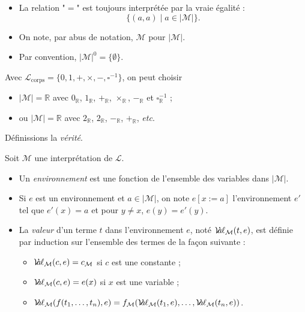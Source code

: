 \documentclass[./main]{subfiles}
\begin{document}
  \begin{rmk}
    \begin{itemize}
      \item La relation "$=$" est toujours interprétée par la vraie égalité :
        \[
        \{(a,a)  \mid a \in |\mathcal{M}|\} 
        .\]
      \item On note, par abus de notation, $\mathcal{M}$ pour $|\mathcal{M}|$.
      \item Par convention, $|\mathcal{M}|^0 = \{\emptyset\}$.
    \end{itemize}
  \end{rmk}

  \begin{exm}
      Avec $\mathcal{L}_\mathrm{corps} = \{0, 1, +, \times , -, \square^{-1}\} $, on peut choisir 
      \begin{itemize}
        \item $|\mathcal{M}| = \mathds{R}$ avec $0_\mathds{R}$, $1_\mathds{R}$, $+_\mathds{R}$, $\times_\mathds{R}$, $-_\mathds{R}$ et $\square^{-1}_\mathds{R}$ ;
        \item ou $|\mathcal{M}| = \mathds{R}$ avec $2_\mathds{R}$, $2_\mathds{R}$, $-_\mathds{R}$, $+_\mathds{R}$, \textit{etc}.
      \end{itemize}
  \end{exm}

  Définissions la \textit{vérité}.

  \begin{defn}
    Soit $\mathcal{M}$ une interprétation de $\mathcal{L}$.
    \begin{itemize}
      \item Un \textit{environnement} est une fonction de l'ensemble des variables dans $|\mathcal{M}|$.
      \item Si $e$ est un environnement et $a \in |\mathcal{M}|$, on note $e[x:=a]$ l'environnement $e'$ tel que $e'(x) = a$ et pour $y \neq x$, $e(y) = e'(y)$.
      \item La \textit{valeur} d'un terme $t$ dans l'environnement $e$, noté $\mathcal{V}\hspace{-3.5pt}a\hspace{-0.5pt}\ell_{\mathcal{M}}(t,e)$, est définie par induction sur l'ensemble des termes de la façon suivante :
        \begin{itemize}
          \item $\mathcal{V}\hspace{-3.5pt}a\hspace{-0.5pt}\ell_{\mathcal{M}}(c, e) = c_{\mathcal{M}}$ si $c$ est une constante ;
          \item $\mathcal{V}\hspace{-3.5pt}a\hspace{-0.5pt}\ell_{\mathcal{M}}(c,e) = e(x)$ si $x$ est une variable ;
          \item $\mathcal{V}\hspace{-3.5pt}a\hspace{-0.5pt}\ell_{\mathcal{M}}(f(t_1, \mathinner{\ldotp\ldotp\ldotp}, t_n), e) = f_{\mathcal{M}}(\mathcal{V}\hspace{-3.5pt}a\hspace{-0.5pt}\ell_{\mathcal{M}}(t_1, e), \mathinner{\ldotp\ldotp\ldotp}, \mathcal{V}\hspace{-3.5pt}a\hspace{-0.5pt}\ell_{\mathcal{M}}(t_n, e))$.
        \end{itemize}
    \end{itemize}
  \end{defn}
\end{document}
